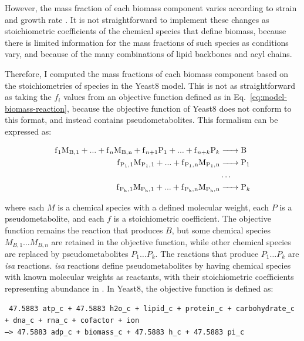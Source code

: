 However, the mass fraction of each biomass component varies according to strain and growth rate \parencite{nilssonMetabolicTradeoffsYeast2016, elsemmanWholecellModelingYeast2022}.
It is not straightforward to implement these changes as stoichiometric coefficients of the chemical species that define biomass, because there is limited information for the mass fractions of such species as conditions vary, and because of the many combinations of lipid backbones and acyl chains.

Therefore, I computed the mass fractions of each biomass component based on the stoichiometries of species in the Yeast8 model.%
This is not as straightforward as taking the $f_{i}$ values from an objective function defined as in Eq.\ \ref{eq:model-biomass-reaction}, because the objective function of Yeast8 does not conform to this format, and instead contains pseudometabolites.
This formalism can be expressed as:

\begin{equation}
  \begin{aligned}
    \ce{f_{1}M_{B,1} + ... + f_{n}M_{B,n} + f_{n+1}P1 + ... + f_{n+k}P_{k} &-> B}\\
    \ce{f_{P_{1},1}M_{P_{1},1} + ... + f_{P_{1},n}M_{P_{1},n} &-> P1}\\
    &\ldots\\
    \ce{f_{P_{k},1}M_{P_{k},1} + ... + f_{P_{k},n}M_{P_{k},n} &-> P_{k}}
    \label{eq:model-pseudometabolites}
  \end{aligned}
\end{equation}

where each $M$ is a chemical species with a defined molecular weight, each $P$ is a pseudometabolite, and each $f$ is a stoichiometric coefficient.
The objective function remains the reaction that produces $B$, but some chemical species $M_{B,1} \ldots M_{B,n}$ are retained in the objective function, while other chemical species are replaced by pseudometabolites $P_{1} \ldots P_{k}$.
The reactions that produce $P_{1} \ldots P_{k}$ are \textit{isa} reactions.
\textit{isa} reactions define pseudometabolites by having chemical species with known molecular weights as reactants, with their stoichiometric coefficients representing abundance in \SI{}{\mmolgdw}.
In Yeast8, the objective function is defined as:

\texttt{
  47.5883 atp\_c + 47.5883 h2o\_c + lipid\_c + protein\_c + carbohydrate\_c\\
  + dna\_c + rna\_c + cofactor + ion \\
  --> 47.5883 adp\_c + biomass\_c + 47.5883 h\_c + 47.5883 pi\_c
}

